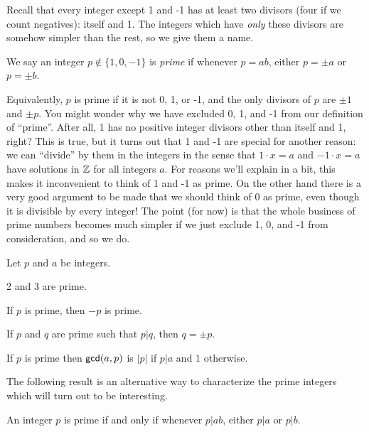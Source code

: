 Recall that every integer except 1 and -1 has at least two divisors (four if we count negatives): itself and 1.
The integers which have \emph{only} these divisors are somehow simpler than the rest, so we give them a name.

\begin{dfn}[Prime] \label{dfn:zz-prime}
We say an integer \(p \notin \{1,0,-1\}\) is \emph{prime} if whenever \(p = ab\), either \(p = \pm a\) or \(p = \pm b\).
\end{dfn}

Equivalently, \(p\) is prime if it is not 0, 1, or -1, and the only divisors of \(p\) are \(\pm 1\) and \(\pm p\).
You might wonder why we have excluded 0, 1, and -1 from our definition of ``prime''.
After all, 1 has no positive integer divisors other than itself and 1, right?
This is true, but it turns out that 1 and -1 are special for another reason: we can ``divide'' by them in the integers in the sense that \(1 \cdot x = a\) and \(-1 \cdot x = a\) have solutions in \(\mathbb{Z}\) for all integers \(a\).
For reasons we'll explain in a bit, this makes it inconvenient to think of 1 and -1 as prime.
On the other hand there is a very good argument to be made that we should think of 0 as prime, even though it is divisible by every integer!
The point (for now) is that the whole business of prime numbers becomes much simpler if we just exclude 1, 0, and -1 from consideration, and so we do.

\begin{prop}\label{prop:zz-prime}
Let \(p\) and \(a\) be integers.
\begin{proplist}
\item 2 and 3 are prime.
\item If \(p\) is prime, then \(-p\) is prime.
\item If \(p\) and \(q\) are prime such that \(p|q\), then \(q = \pm p\).
\item \label{prop:zz-prime:gcd} If \(p\) is prime then \(\mathsf{gcd}(a, p)\) is \(|p|\) if \(p|a\) and \(1\) otherwise.
\end{proplist}
\end{prop}

The following result is an alternative way to characterize the prime integers which will turn out to be interesting.

\begin{prop} \label{prop:zz-prime-2}
An integer \(p\) is prime if and only if whenever \(p|ab\), either \(p|a\) or \(p|b\).
\end{prop}

